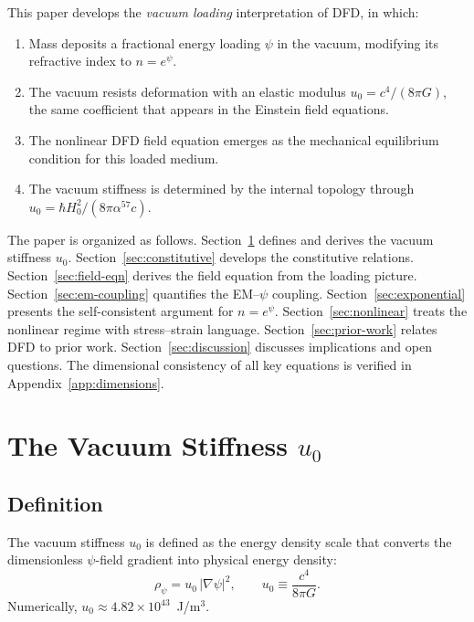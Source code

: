 \documentclass[aps,prd,twocolumn,superscriptaddress,nofootinbib]{revtex4-2}
\begin{document}
This paper develops the \emph{vacuum loading} interpretation of DFD,
in which:
\begin{enumerate}
\item Mass deposits a fractional energy loading $\psi$ in the vacuum,
modifying its refractive index to $n = e^\psi$.
\item The vacuum resists deformation with an elastic modulus
$u_0 = c^4/(8\pi G)$, the same coefficient that appears in the
Einstein field equations.
\item The nonlinear DFD field equation emerges as the mechanical
equilibrium condition for this loaded medium.
\item The vacuum stiffness is determined by the internal topology
through $u_0 = \hbar H_0^2/(8\pi\alpha^{57}c)$.
\end{enumerate}

The paper is organized as follows.  Section~\ref{sec:stiffness}
defines and derives the vacuum stiffness $u_0$.
Section~\ref{sec:constitutive} develops the constitutive relations.
Section~\ref{sec:field-eqn} derives the field equation from the
loading picture.  Section~\ref{sec:em-coupling} quantifies the
EM--$\psi$ coupling.  Section~\ref{sec:exponential} presents the
self-consistent argument for $n = e^\psi$.
Section~\ref{sec:nonlinear} treats the nonlinear regime with
stress--strain language.
Section~\ref{sec:prior-work} relates DFD to prior work.
Section~\ref{sec:discussion} discusses implications and open questions.
The dimensional consistency of all key equations is verified in
Appendix~\ref{app:dimensions}.


\section{The Vacuum Stiffness $u_0$}
\label{sec:stiffness}

\subsection{Definition}

The vacuum stiffness $u_0$ is defined as the energy density scale that
converts the dimensionless $\psi$-field gradient into physical energy
density:
\begin{equation}
\rho_\psi = u_0\,|\nabla\psi|^2, \qquad
u_0 \equiv \frac{c^4}{8\pi G}.
\label{eq:u0-def}
\end{equation}
Numerically, $u_0 \approx 4.82 \times 10^{43}$~J/m$^3$.
\end{document}
